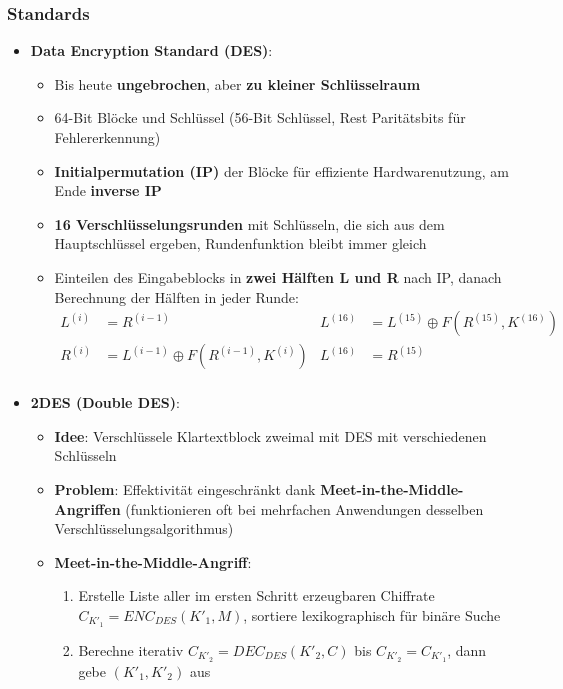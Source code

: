 \newpage
\subsubsection{Standards}%
\label{symver:ssub:standards}

\begin{itemize}	
	\item \textbf{Data Encryption Standard (DES)}:
	\begin{itemize}
		\item Bis heute \textbf{ungebrochen}, aber \textbf{zu kleiner Schlüsselraum}
		\item 64-Bit Blöcke und Schlüssel (56-Bit Schlüssel, Rest Paritätsbits für Fehlererkennung)
		\item \textbf{Initialpermutation (IP)} der Blöcke für effiziente Hardwarenutzung, am Ende \textbf{inverse IP}
		\item \textbf{16 Verschlüsselungsrunden} mit Schlüsseln, die sich aus dem Hauptschlüssel ergeben, Rundenfunktion bleibt immer gleich
		\item Einteilen des Eingabeblocks in \textbf{zwei Hälften L und R} nach IP, danach Berechnung der Hälften in jeder Runde:
		\begin{align*}
			L^{(i)} &= R^{(i-1)} 						  	& L^{(16)} &= L^{(15)} \oplus F(R^{(15)}, K^{(16)})\\
			R^{(i)} &= L^{(i-1)} \oplus F(R^{(i-1)}, K^{(i)}) & L^{(16)} &= R^{(15)}\\
		\end{align*}
	\end{itemize}
	\item \textbf{2DES (Double DES)}:
	\begin{itemize}
		\item \textbf{Idee}: Verschlüssele Klartextblock zweimal mit DES mit verschiedenen Schlüsseln
		\item \textbf{Problem}: Effektivität eingeschränkt dank \textbf{Meet-in-the-Middle-Angriffen} (funktionieren oft bei mehrfachen Anwendungen desselben Verschlüsselungsalgorithmus)
		\item \textbf{Meet-in-the-Middle-Angriff}:
		\begin{enumerate}
			\item Erstelle Liste aller im ersten Schritt erzeugbaren Chiffrate $C_{K'_1} = ENC_{DES}(K'_1, M)$, sortiere lexikographisch für binäre Suche
			\item Berechne iterativ $C_{K'_2} = DEC_{DES}(K'_2, C)$ bis $C_{K'_2} = C_{K'_1}$, dann gebe $(K'_1, K'_2)$ aus
		\end{enumerate}

\end{itemize}
\end{itemize}
